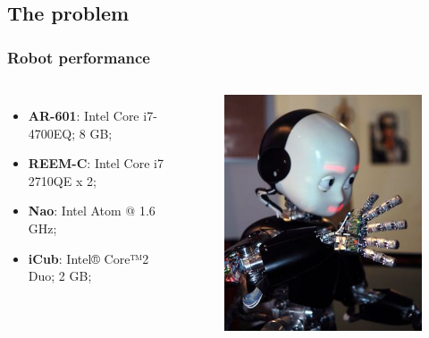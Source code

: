\documentclass[12pt, aspectratio=169]{beamer}
\begin{document}
\subsection{The problem} %
\begin{frame}
\frametitle{Robot performance}
\begin{columns}[c] %

\begin{itemize}
\item \textbf{AR-601}: Intel Core i7-4700EQ; 8 GB;
\item \textbf{REEM-C}: Intel Core i7 2710QE x 2;
\item \textbf{Nao}: Intel Atom @ 1.6 GHz;
\item \textbf{iCub}: Intel® Core™2 Duo; 2 GB;
\end{itemize}


\begin{figure}
\includegraphics[width=0.7\linewidth]{330px-ICub_sciencefestival_1}
\end{figure}
\end{columns}
\end{frame}
\end{document}
